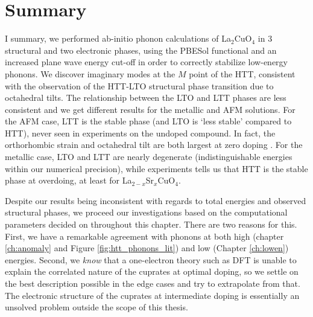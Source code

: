 \section{Summary}
I summary, we performed ab-initio phonon calculations of La$_2$CuO$_4$ in 3 structural and two electronic phases, using the PBESol functional and an increased plane wave energy cut-off in order to correctly stabilize low-energy phonons. We discover imaginary modes at the $M$ point of the HTT, consistent with the observation of the HTT-LTO structural phase transition due to octahedral tilts. The relationship between the LTO and LTT phases are less consistent and we get different results for the metallic and AFM solutions. For the AFM case, LTT is the stable phase (and LTO is `less stable' compared to HTT), never seen in experiments on the undoped compound. In fact, the orthorhombic strain and octahedral tilt are both largest at zero doping \cite{Radaelli1994a}. For the metallic case, LTO and LTT are nearly degenerate (indistinguishable energies within our numerical precision), while experiments tells us that HTT is the stable phase at overdoing, at least for La$_{2-x}$Sr$_x$CuO$_4$.

Despite our results being inconsistent with regards to total energies and observed structural phases, we proceed our investigations based on the computational parameters decided on throughout this chapter. There are two reasons for this. First, we have a remarkable agreement with phonons at both high (chapter \ref{ch:anomaly} and Figure \ref{fig:htt_phonons_lit}) and low (Chapter \ref{ch:lowen}) energies. Second, we \emph{know} that a one-electron theory such as DFT is unable to explain the correlated nature of the cuprates at optimal doping, so we settle on the best description possible in the edge cases and try to extrapolate from that. The electronic structure of the cuprates at intermediate doping is essentially an unsolved problem outside the scope of this thesis.